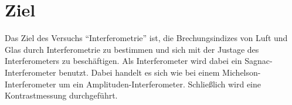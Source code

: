 \section{Ziel}
\label{sec:Ziel}

Das Ziel des Versuchs \enquote{Interferometrie} ist, 
die Brechungsindizes von Luft und Glas durch Interferometrie zu bestimmen und sich mit der Justage des Interferometers zu beschäftigen.
Als Interferometer wird dabei ein Sagnac-Interferometer benutzt.
Dabei handelt es sich wie bei einem Michelson-Interferometer um ein Amplituden-Interferometer.
Schließlich wird eine Kontrastmessung durchgeführt.